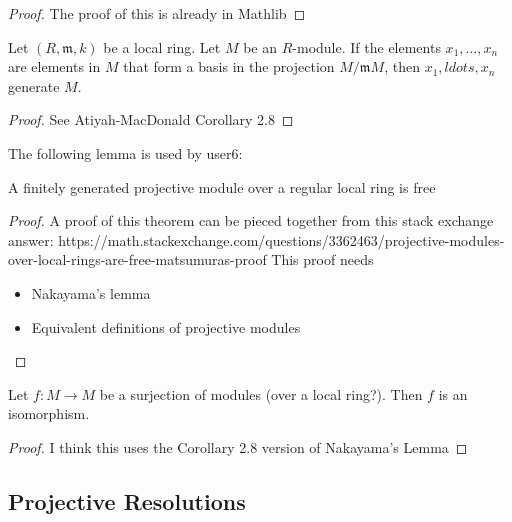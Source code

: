 \begin{proof}
  The proof of this is already in Mathlib
\end{proof}

\begin{corollary}
  \label{cor:local_maximal_gereating_set_basis_residue}
  Let $(R,\mathfrak{m},k)$ be a local ring. 
  Let $M$ be an $R$-module.
  If the elements $x_1, \ldots, x_n$ are elements in
  $M$ that form a basis in the projection 
  $M / \mathfrak{m} M$, then $x_1, ldots, x_n$ generate $M$.
\end{corollary}

\begin{proof}
  See Atiyah-MacDonald Corollary 2.8
\end{proof}

The following lemma is used by user6:

\begin{lemma} \label{lem:fin_gen_proj_over_local_is_free}
	A finitely generated projective module 
	over a regular local ring is free
\end{lemma}

\begin{proof}
	A proof of this theorem can be pieced together from this
	stack exchange answer:
	https://math.stackexchange.com/questions/3362463/projective-modules-over-local-rings-are-free-matsumuras-proof
	This proof needs
	\begin{itemize}
		\item Nakayama's lemma
		\item Equivalent definitions of projective modules
	\end{itemize}
\end{proof}

\begin{lemma}
  \label{lem:surj_endo_is_isom}
  Let $f : M \to M$ be a surjection of modules 
  (over a local ring?).
  Then $f$ is an isomorphism.
\end{lemma}

\begin{proof}

  I think this uses the Corollary 2.8 version of Nakayama's Lemma
\end{proof}


\subsection{Projective Resolutions}

